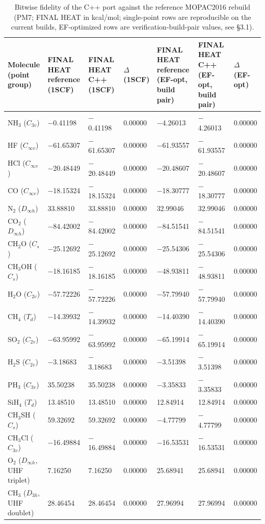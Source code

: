 \documentclass[preprint,12pt]{elsarticle}
\begin{document}
\begin{table}[htbp]
\centering
\caption{Bitwise fidelity of the C++ port against the reference MOPAC2016 rebuild (PM7; FINAL HEAT in kcal/mol; single-point rows are reproducible on the current builds, EF-optimized rows are verification-build-pair values, see \S{}3.1).}
\label{tab:Bitwisefidelityo}
\begin{tabular}{lllllll}
\hline
\textbf{Molecule (point group)} & \textbf{FINAL HEAT reference (1SCF)} & \textbf{FINAL HEAT C++ (1SCF)} & \textbf{$\Delta$ (1SCF)} & \textbf{FINAL HEAT reference (EF-opt, build pair)} & \textbf{FINAL HEAT C++ (EF-opt, build pair)} & \textbf{$\Delta$ (EF-opt)} \\
\hline
NH$_{3}$ ($C_{3v}$) & $-$0.41198 & $-$0.41198 & 0.00000 & $-$4.26013 & $-$4.26013 & 0.00000 \\
HF ($C_{\infty v}$) & $-$61.65307 & $-$61.65307 & 0.00000 & $-$61.93557 & $-$61.93557 & 0.00000 \\
HCl ($C_{\infty v}$) & $-$20.48449 & $-$20.48449 & 0.00000 & $-$20.48607 & $-$20.48607 & 0.00000 \\
CO ($C_{\infty v}$) & $-$18.15324 & $-$18.15324 & 0.00000 & $-$18.30777 & $-$18.30777 & 0.00000 \\
N$_{2}$ ($D_{\infty h}$) & 33.88810 & 33.88810 & 0.00000 & 32.99046 & 32.99046 & 0.00000 \\
CO$_{2}$ ($D_{\infty h}$) & $-$84.42002 & $-$84.42002 & 0.00000 & $-$84.51541 & $-$84.51541 & 0.00000 \\
CH$_{2}$O ($C_s$) & $-$25.12692 & $-$25.12692 & 0.00000 & $-$25.54306 & $-$25.54306 & 0.00000 \\
CH$_{3}$OH ($C_s$) & $-$18.16185 & $-$18.16185 & 0.00000 & $-$48.93811 & $-$48.93811 & 0.00000 \\
H$_{2}$O ($C_{2v}$) & $-$57.72226 & $-$57.72226 & 0.00000 & $-$57.79940 & $-$57.79940 & 0.00000 \\
CH$_{4}$ ($T_d$) & $-$14.39932 & $-$14.39932 & 0.00000 & $-$14.40390 & $-$14.40390 & 0.00000 \\
SO$_{2}$ ($C_{2v}$) & $-$63.95992 & $-$63.95992 & 0.00000 & $-$65.19914 & $-$65.19914 & 0.00000 \\
H$_{2}$S ($C_{2v}$) & $-$3.18683 & $-$3.18683 & 0.00000 & $-$3.51398 & $-$3.51398 & 0.00000 \\
PH$_{3}$ ($C_{3v}$) & 35.50238 & 35.50238 & 0.00000 & $-$3.35833 & $-$3.35833 & 0.00000 \\
SiH$_{4}$ ($T_d$) & 13.48510 & 13.48510 & 0.00000 & 12.84914 & 12.84914 & 0.00000 \\
CH$_{3}$SH ($C_s$) & 59.32692 & 59.32692 & 0.00000 & $-$4.77799 & $-$4.77799 & 0.00000 \\
CH$_{3}$Cl ($C_{3v}$) & $-$16.49884 & $-$16.49884 & 0.00000 & $-$16.53531 & $-$16.53531 & 0.00000 \\
O$_{2}$ ($D_{\infty h}$, UHF triplet) & 7.16250 & 7.16250 & 0.00000 & 25.68941 & 25.68941 & 0.00000 \\
CH$_{3}$ ($D_{3h}$, UHF doublet) & 28.46454 & 28.46454 & 0.00000 & 27.96994 & 27.96994 & 0.00000 \\
\hline
\end{tabular}
\end{table}
\end{document}
